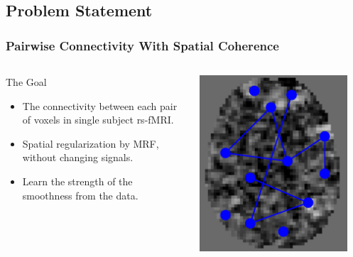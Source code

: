 \documentclass[sansserif, 10pt]{beamer}
\begin{document}
\subsection{Problem Statement}
\begin{frame}
  \frametitle{Pairwise Connectivity With Spatial Coherence}
  \begin{columns}
    \begin{column}{0.5\textwidth}
      \begin{block}{The Goal}
        \begin{itemize}
        \item The connectivity between each pair of voxels in single subject
          rs-fMRI.
        \item Spatial regularization by MRF, without changing signals. 
        \item Learn the strength of the smoothness from the data.
        \end{itemize}
      \end{block}
      \end{column}
    \begin{column}{0.5\textwidth}
      \includegraphics[width=0.9\textwidth]{sfig/pairwise_conn}
    \end{column}
  \end{columns}
\end{frame}
\end{document}

